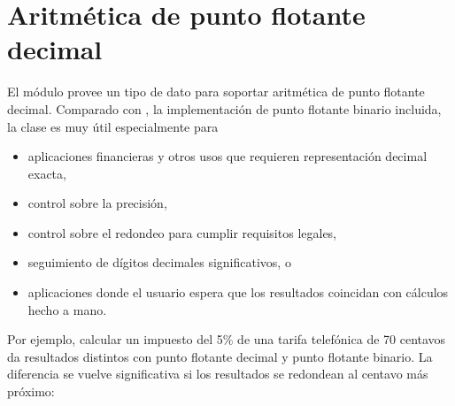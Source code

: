 \documentclass[a4,10pt,spanish]{sphinxmanual}
\begin{document}
\section{Aritmética de punto flotante decimal}
\label{\detokenize{tutorial/stdlib2:decimal-floating-point-arithmetic}}\label{\detokenize{tutorial/stdlib2:tut-decimal-fp}}
\sphinxAtStartPar
El módulo  provee un tipo de dato  para soportar aritmética de punto flotante decimal.  Comparado con , la implementación de punto flotante binario incluida, la clase es muy útil especialmente para
\begin{itemize}
\item {} 
\sphinxAtStartPar
aplicaciones financieras y otros usos que requieren representación decimal exacta,

\item {} 
\sphinxAtStartPar
control sobre la precisión,

\item {} 
\sphinxAtStartPar
control sobre el redondeo para cumplir requisitos legales,

\item {} 
\sphinxAtStartPar
seguimiento de dígitos decimales significativos, o

\item {} 
\sphinxAtStartPar
aplicaciones donde el usuario espera que los resultados coincidan con cálculos hecho a mano.

\end{itemize}

\sphinxAtStartPar
Por ejemplo, calcular un impuesto del 5\% de una tarifa telefónica de 70 centavos da resultados distintos con punto flotante decimal y punto flotante binario. La diferencia se vuelve significativa si los resultados se redondean al centavo más próximo:

\begin{sphinxVerbatim}[commandchars=\\\{\}]
   
   
   
\end{sphinxVerbatim}
\end{document}
